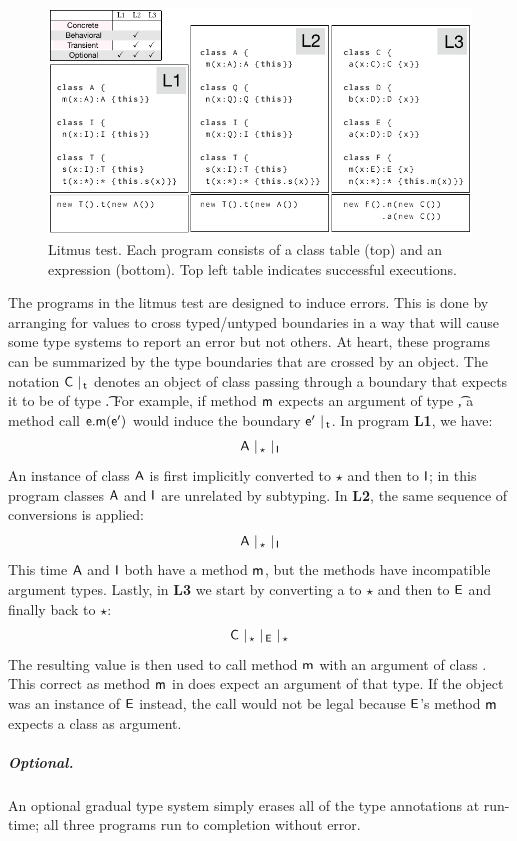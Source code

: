 \documentclass[a4paper,UKenglish]{lipics-v2018}
\newcommand{\EM}[1]{\ensuremath{#1}\xspace}
\newcommand{\xt}[1]{{\sf{#1}}}
\newcommand{\EMxt}[1]{\EM{\xt{#1}}}
\newcommand{\m}{\EMxt m}
\newcommand{\A}{\EMxt {A}}
\newcommand{\I}{\EMxt {I}}
\newcommand{\E}{\EMxt {E}}
\newcommand{\any}{\EM{\star}}
\begin{document}
\begin{figure}[h] 
\includegraphics[width=.95\columnwidth]{litm}
\caption{Litmus test. Each program consists of a class table (top) and
an expression (bottom). Top left table indicates successful
executions.}\label{litmus}
\end{figure}

The programs in the litmus test are designed to induce errors. This is done by arranging for
values to cross typed/untyped boundaries in a way that will cause some type
systems to report an error but not others. At heart, these programs can 
be summarized by the
type boundaries that are crossed by an object. The
notation $\C ~\vert_{\,\t}$ denotes an object of class \C passing
through a boundary that expects it to be of type \t. For example,
if method \m expects an argument of type \t, a method call $\e.\m(\ep)$ would
induce the boundary $\ep ~\vert_{\,\t}$. 
In program {\bf L1}, we have:
\[\A ~\vert_{\,\any} ~ \vert_{\,\I}\] 
An instance of 
class \A is first implicitly converted to \any and then to \I; in this program
classes \A and \I are unrelated by subtyping. In {\bf L2}, the same sequence
of conversions is applied:
\[\A~ \vert_{\,\any} ~ \vert_{\,\I}\] 
This time \A and \I both have a
method \m, but the methods have incompatible argument types. Lastly, in
{\bf L3} we start by converting a \C to \any and then to \E
and finally back to \any:
\[\C~ \vert_{\,\any}~\vert_{\,\E}~\vert_{\,\any}\]
The resulting value is then used to call method \m with an argument of class \C.
This correct as method \m in \C does expect an
argument of that type. If the object was an instance of \E instead, the call
would not be legal because \E's method \m expects a class \D as argument.

\subparagraph*{Optional.} An optional gradual type system simply erases all of the
type annotations at run-time; all three programs run to completion without
error.
\end{document}
